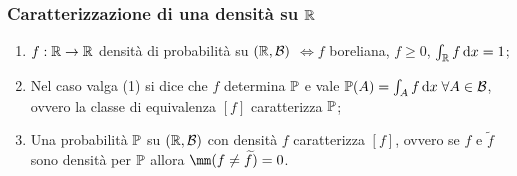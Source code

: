 \subsubsection{Caratterizzazione di una densità su $\mathbb R$}

\begin{teob}\label{teo-f-densita}
  \begin{enumerate}
    \Fixvmode
    \item $f:\mathbb R \to \mathbb R$ densità di probabilità su $(\mathbb R, \mathcal B)$
      $\iff f$ boreliana, $f \geq 0$, $\int_{\mathbb R} f \, \mathrm d x = 1$;
    \item Nel caso valga (1) si dice che $f$ determina $\mathbb P$ e vale $\mathbb P(A) = \int_{A} f \, \mathrm d x \; \forall A \in \mathcal B$, ovvero la classe di equivalenza $[f]$ caratterizza $\mathbb P$;
    \item Una probabilità $\mathbb P$ su $(\mathbb R, \mathcal B)$ con densità $f$ caratterizza $[f]$, ovvero se $f$ e $\widetilde{f}$ sono densità per $\mathbb P$ allora $\mm(f \neq \widetilde{f}) = 0$.
  \end{enumerate}
\end{teob}
\medskip
